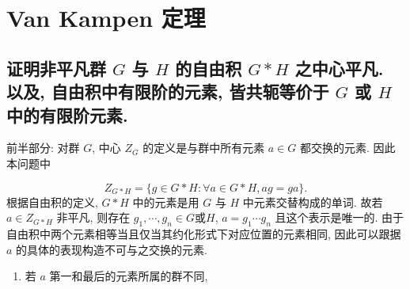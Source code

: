 \section{Van Kampen 定理}

\subsection{证明非平凡群 $G$ 与 $H$ 的自由积 $G \ast H$ 之中心平凡. 以及, 自由积中有限阶的元素, 皆共轭等价于 $G$ 或 $H$ 中的有限阶元素.} %

前半部分: 对群 $G$, 中心 $Z_G$ 的定义是与群中所有元素 $a \in G$ 都交换的元素. 因此本问题中

$$
Z_{G \ast H} = \{g \in G \ast H: \forall a \in G \ast H, ag = ga\}.
$$
根据自由积的定义, $G \ast H$ 中的元素是用 $G$ 与 $H$ 中元素交替构成的单词. 故若 $a \in Z_{G \ast H}$ 非平凡, 则存在 $g_1, \cdots, g_n \in G \text{或} H$, $a = g_1 \cdots g_n$ 且这个表示是唯一的. 由于自由积中两个元素相等当且仅当其约化形式下对应位置的元素相同, 因此可以跟据 $a$ 的具体的表现构造不可与之交换的元素. 
\begin{enumerate}[label=(\arabic*)]
    \item 若 $a$ 第一和最后的元素所属的群不同, 
\end{enumerate}